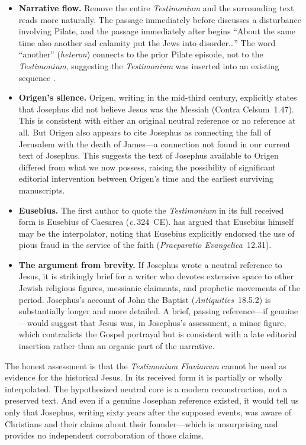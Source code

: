\documentclass[12pt,oneside]{article}
\newcommand{\circa}{\textit{c.}\,}
\newcommand{\grk}[1]{\textit{#1}}   %
\begin{document}
\begin{itemize}[leftmargin=2em]
\item \textbf{Narrative flow.}  Remove the entire \textit{Testimonium}
and the surrounding text reads more naturally.  The passage immediately
before discusses a disturbance involving Pilate, and the passage
immediately after begins ``About the same time also another sad
calamity put the Jews into disorder\ldots''  The word ``another''
(\grk{heteron}) connects to the prior Pilate episode, not to the
\textit{Testimonium}, suggesting the \textit{Testimonium} was inserted
into an existing sequence \citep{Olson1999}.

\item \textbf{Origen's silence.}  Origen, writing in the mid-third
century, explicitly states that Josephus did not believe Jesus was
the Messiah (Contra Celsum~1.47).  This is consistent with either
an original neutral reference or no reference at all.  But Origen
also appears to cite Josephus as connecting the fall of Jerusalem
with the death of James---a connection not found in our current text
of Josephus.  This suggests the text of Josephus available to Origen
differed from what we now possess, raising the possibility of
significant editorial intervention between Origen's time and the
earliest surviving manuscripts.

\item \textbf{Eusebius.}  The first author to quote the
\textit{Testimonium} in its full received form is Eusebius of
Caesarea (\circa 324~CE).  \citet{Olson1999} has argued that Eusebius
himself may be the interpolator, noting that Eusebius explicitly
endorsed the use of pious fraud in the service of the faith
(\textit{Praeparatio Evangelica}~12.31).

\item \textbf{The argument from brevity.}  If Josephus wrote a neutral
reference to Jesus, it is strikingly brief for a writer who devotes
extensive space to other Jewish religious figures, messianic claimants,
and prophetic movements of the period.  Josephus's account of John the
Baptist (\textit{Antiquities}~18.5.2) is substantially longer and more
detailed.  A brief, passing reference---if genuine---would suggest that
Jesus was, in Josephus's assessment, a minor figure, which contradicts
the Gospel portrayal but is consistent with a late editorial insertion
rather than an organic part of the narrative.
\end{itemize}

The honest assessment is that the \textit{Testimonium Flavianum} cannot
be used as evidence for the historical Jesus.  In its received form it
is partially or wholly interpolated.  The hypothesized neutral core is
a modern reconstruction, not a preserved text.  And even if a genuine
Josephan reference existed, it would tell us only that Josephus, writing
sixty years after the supposed events, was aware of Christians and their
claims about their founder---which is unsurprising and provides no
independent corroboration of those claims.
\end{document}
